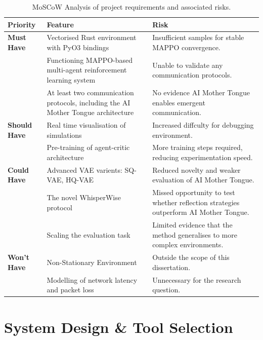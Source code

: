\begin{table}[H]
    \centering
    \caption{MoSCoW Analysis of project requirements and associated risks.}
    \label{tab:moscow_analysis}
    \small
    \begin{tabularx}{\textwidth}{@{} l X X @{}}
        \toprule
        \textbf{Priority} & \textbf{Feature} & \textbf{Risk} \\ \midrule
        \textbf{Must Have} & Vectorised Rust environment with PyO3 bindings & Insufficient samples for stable MAPPO convergence. \\ \addlinespace
        \textbf{} & Functioning MAPPO-based multi-agent reinforcement learning system & Unable to validate any communication protocols. \\ \addlinespace
        \textbf{} & At least two communication protocols, including the AI Mother Tongue architecture & No evidence AI Mother Tongue enables emergent communication. \\ \midrule
        \textbf{Should Have} & Real time visualisation of simulations & Increased diffculty for debugging environment. \\ \addlinespace
        \textbf{} & Pre-training of agent-critic architecture & More training steps required, reducing experimentation speed. \\ \midrule
        \textbf{Could Have} & Advanced VAE varients: SQ-VAE, HQ-VAE & Reduced novelty and weaker evaluation of AI Mother Tongue. \\ \addlinespace
        \textbf{} & The novel WhisperWise protocol & Missed opportunity to test whether reflection strategies outperform AI Mother Tongue. \\ \addlinespace
        \textbf{} & Scaling the evaluation task & Limited evidence that the method generalises to more complex environments. \\ \midrule
        \textbf{Won't Have} & Non-Stationary Environment & Outside the scope of this dissertation. \\ \addlinespace
        \textbf{} & Modelling of network latency and packet loss & Unnecessary for the research question. \\ \bottomrule
    \end{tabularx}
\end{table}


\section{System Design \& Tool Selection}
\label{sec:2.6}

